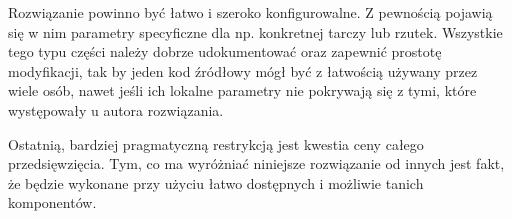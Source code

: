 Rozwiązanie powinno być łatwo i szeroko konfigurowalne. Z pewnością pojawią się w nim parametry specyficzne dla np. konkretnej tarczy lub rzutek. Wszystkie tego typu części należy dobrze udokumentować oraz zapewnić prostotę modyfikacji, tak by jeden kod źródłowy mógł być z łatwością używany przez wiele osób, nawet jeśli ich lokalne parametry nie pokrywają się z tymi, które występowały u autora rozwiązania. 

Ostatnią, bardziej pragmatyczną restrykcją jest kwestia ceny całego przedsięwzięcia. Tym, co ma wyróżniać niniejsze rozwiązanie od innych jest fakt, że będzie wykonane przy użyciu łatwo dostępnych i możliwie tanich komponentów.